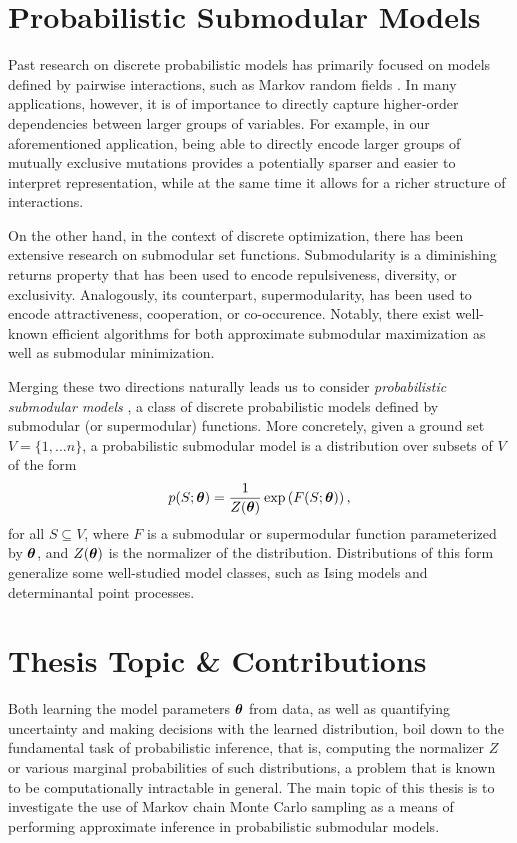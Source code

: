 \section{Probabilistic Submodular Models}
Past research on discrete probabilistic models has primarily focused on models defined by pairwise interactions, such as Markov random fields \citep{koller09}.
In many applications, however, it is of importance to directly capture higher-order dependencies between larger groups of variables.
For example, in our aforementioned application, being able to directly encode larger groups of mutually exclusive mutations provides a potentially sparser and easier to interpret representation, while at the same time it allows for a richer structure of interactions.

On the other hand, in the context of discrete optimization, there has been extensive research on submodular set functions.
Submodularity is a diminishing returns property that has been used to encode repulsiveness, diversity, or exclusivity.
Analogously, its counterpart, supermodularity, has been used to encode attractiveness, cooperation, or co-occurence.
Notably, there exist well-known efficient algorithms for both approximate submodular maximization as well as submodular minimization.

Merging these two directions naturally leads us to consider \emph{probabilistic submodular models} \citep{djolonga14,gotovos15}, a class of discrete probabilistic models defined by submodular (or supermodular) functions.
More concretely, given a ground set $V = \{1,\ldots n\}$, a probabilistic submodular model is a distribution over subsets of $V$ of the form
\begin{align*}
p(S; \bm{\theta}) = \frac{1}{Z(\bm{\theta})} \exp\left( F(S; \bm{\theta}) \right),
\end{align*}
for all $S \subseteq V$, where $F$ is a submodular or supermodular function parameterized by $\bm{\theta}$, and $Z(\bm{\theta})$ is the normalizer of the distribution.
Distributions of this form generalize some well-studied model classes, such as Ising models and determinantal point processes.

\section{Thesis Topic \& Contributions}
Both learning the model parameters $\bm{\theta}$ from data, as well as quantifying uncertainty and making decisions with the learned distribution, boil down to the fundamental task of probabilistic inference, that is, computing the normalizer $Z$ or various marginal probabilities of such distributions, a problem that is known to be computationally intractable in general.
The main topic of this thesis is to investigate the use of Markov chain Monte Carlo sampling as a means of performing approximate inference in probabilistic submodular models.

